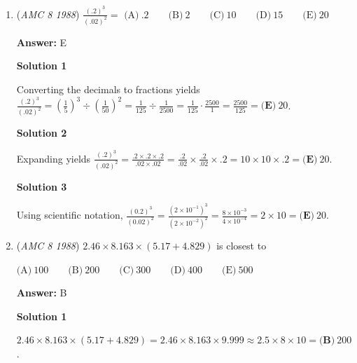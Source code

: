 \begin{enumerate}
$\text{(A)}\ 20^\circ \qquad \text{(B)}\ 40^\circ \qquad \text{(C)}\ 50^\circ \qquad \text{(D)}\ 70^\circ \qquad \text{(E)}\ 120^\circ$

 \textbf{Answer: }C



\textbf{Solution}

$\angle OBA = 20^{\circ}$, $\angle CBD = 90^{\circ}$, and $\angle OBD = 160^{\circ}$.  So $\angle ABC = 160^{\circ} - 20^{\circ} - 90^{\circ} = \boxed{\textbf{(C)}\ 50^{\circ}}$.

 


	\item (\textit{AMC 8 1988}) $\frac{(.2)^3}{(.02)^2} =$
$\text{(A)}\ .2 \qquad \text{(B)}\ 2 \qquad \text{(C)}\ 10 \qquad \text{(D)}\ 15 \qquad \text{(E)}\ 20$

 \textbf{Answer: }E



\textbf{Solution 1}

Converting the decimals to fractions yields $\frac{(.2)^3}{(.02)^2} = \left( \frac{1}{5}\right)^3 \div \left(\frac{1}{50}\right)^2 =  \frac{1}{125} \div \frac{1}{2500} = \frac{1}{125} \cdot \frac{2500}{1} = \frac{2500}{125}=\boxed{\textbf{(E)}\ 20}$.

 



\textbf{Solution 2}

Expanding yields $\frac{(.2)^3}{(.02)^2} = \frac{.2 \times .2 \times .2}{.02 \times .02} = \frac{.2}{.02}\times\frac{.2}{.02}\times{.2} = 10 \times 10 \times .2 = \boxed{\textbf{(E)}\ 20}$.

 



\textbf{Solution 3}

Using scientific notation, $\frac{(0.2)^3}{(0.02)^2} = \frac{(2 \times 10^{-1})^3}{(2 \times 10^{-2})^2} = \frac{8 \times 10^{-3}}{4 \times 10^{-4}} = 2 \times 10 = \boxed{\textbf{(E)}\ 20}$.

 


	\item (\textit{AMC 8 1988}) $2.46\times 8.163\times (5.17+4.829)$ is closest to


 $\text{(A)}\ 100 \qquad \text{(B)}\ 200 \qquad \text{(C)}\ 300 \qquad \text{(D)}\ 400 \qquad \text{(E)}\ 500$

 \textbf{Answer: }B



\textbf{Solution 1}

$2.46 \times 8.163 \times (5.17 + 4.829) = 2.46 \times 8.163 \times 9.999 \approx 2.5 \times 8 \times 10 = \boxed{\textbf{(B)}\ 200}$.


\end{enumerate}
